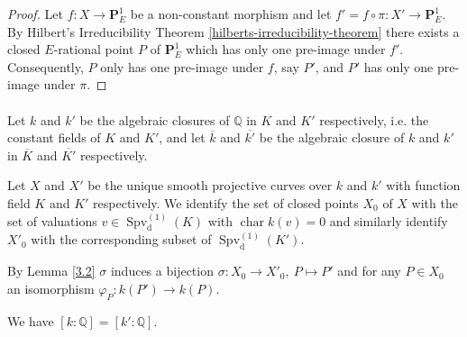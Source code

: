 \begin{proof}
Let $f: X\to\mathbf{P}^1_E$ be a non-constant morphism and let $f' =  f\circ \pi: X'\to\mathbf{P}^1_E$. By Hilbert's Irreducibility Theorem \ref{hilberts-irreducibility-theorem} there exists a closed $E$-rational point $P$ of $\mathbf{P}^1_E$ which has only one pre-image under $f'$. Consequently, $P$ only has one pre-image under $f$, say $P'$, and $P'$ has only one pre-image under $\pi$.
\end{proof}

\paragraph{} Let $k$ and $k'$ be the algebraic closures of $\mathbb{Q}$ in $K$ and $K'$ respectively, i.e. the constant fields of $K$ and $K'$, and let $\overline{k}$ and $\overline{k'}$ be the algebraic closure of $k$ and $k'$ in $\overline{K}$ and $\overline{K'}$ respectively.

Let $X$ and $X'$ be the unique smooth projective curves over $k$ and $k'$ with function field $K$ and $K'$ respectively. We identify the set of closed points $X_0$ of $X$ with the set of valuations $v\in\operatorname{Spv}_\text{d}^{(1)}(K)$ with $\operatorname{char} k(v)=0$ and similarly identify $X'_0$ with the corresponding subset of $\operatorname{Spv}_\text{d}^{(1)}(K')$. 

By Lemma \ref{3.2} $\sigma$ induces a bijection $\sigma: X_0\to X'_0,\ P\mapsto P'$ and for any $P\in X_0$ an isomorphism $\varphi_P: k(P')\to k(P)$.

\begin{lemma}\label{4.2-pre}
We have $[k:\mathbb{Q}] = [k':\mathbb{Q}]$.
\end{lemma}

